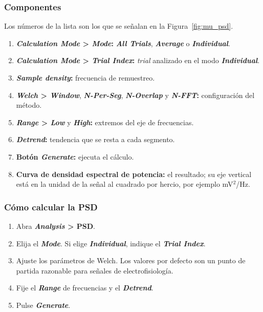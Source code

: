 \documentclass[11pt,a4paper]{article}
\begin{document}
    \subsubsection*{Componentes}
    Los n\'umeros de la lista son los que se se\~nalan en la Figura~\ref{fig:mu_psd}.
    \begin{enumerate}[label=(\arabic*)]
        \item \textbf{\textit{Calculation Mode} > \textit{Mode}:} \textbf{\textit{All Trials}}, \textbf{\textit{Average}} o \textbf{\textit{Individual}}.
        \item \textbf{\textit{Calculation Mode} > \textit{Trial Index}:} \textit{trial} analizado en el modo \textbf{\textit{Individual}}.
        \item \textbf{\textit{Sample density}:} frecuencia de remuestreo.
        \item \textbf{\textit{Welch} > \textit{Window}}, \textbf{\textit{N-Per-Seg}}, \textbf{\textit{N-Overlap}} y \textbf{\textit{N-FFT}:} configuraci\'on del m\'etodo.
        \item \textbf{\textit{Range} > \textit{Low}} y \textbf{\textit{High}:} extremos del eje de frecuencias.
        \item \textbf{\textit{Detrend}:} tendencia que se resta a cada segmento.
        \item \textbf{Bot\'on \textit{Generate}:} ejecuta el c\'alculo.
        \item \textbf{Curva de densidad espectral de potencia:} el resultado; su eje vertical est\'a en la unidad de la se\~nal al cuadrado por hercio, por ejemplo mV$^2$/Hz.
    \end{enumerate}

    \subsubsection*{C\'omo calcular la PSD}
    \begin{enumerate}
        \item Abra \textbf{\textit{Analysis} > PSD}.
        \item Elija el \textbf{\textit{Mode}}. Si elige \textbf{\textit{Individual}}, indique el \textbf{\textit{Trial Index}}.
        \item Ajuste los par\'ametros de Welch. Los valores por defecto son un punto de partida razonable para se\~nales de electrofisiolog\'ia.
        \item Fije el \textbf{\textit{Range}} de frecuencias y el \textbf{\textit{Detrend}}.
        \item Pulse \textbf{\textit{Generate}}.
    \end{enumerate}
\end{document}
